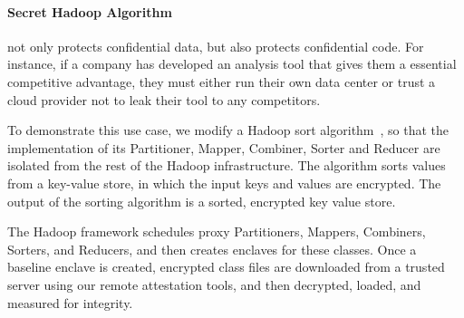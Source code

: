 


\paragraph{Secret Hadoop Algorithm}
\sysname{} not only protects confidential data, but also protects confidential code.
For instance, if a company has developed an analysis tool that gives them a essential competitive advantage,
they must either run their own data center or trust a cloud provider not to leak their tool 
to any competitors.

To demonstrate this use case, we modify a Hadoop sort algorithm~\cite{hadoop-sort},
so that the implementation of its Partitioner, Mapper, Combiner, Sorter and Reducer
are isolated from the rest of the Hadoop infrastructure. 
The algorithm sorts values from a key-value store, in which
the input keys and values are encrypted.
The output of the sorting algorithm is a sorted, encrypted key value store.

The Hadoop framework schedules proxy Partitioners, Mappers, Combiners, Sorters, and Reducers,
and then creates enclaves for these classes.
Once a baseline \sysname{} enclave is created, encrypted class files
are downloaded from a trusted server using our remote attestation tools,
and then decrypted, loaded, and measured for integrity. 

